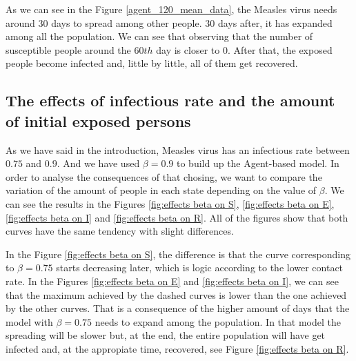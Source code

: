 \documentclass[a4paper]{article}
\begin{document}
As we can see in the Figure \ref{agent_120_mean_data}, the Measles virus needs around $30$ days to spread among other people. $30$ days after, it has expanded among all the population. We can see that observing that the number of susceptible people around the $60th$ day is closer to $0$. After that, the exposed people become infected and, little by little, all of them get recovered.

\subsection{The effects of infectious rate and the amount of initial exposed persons} %
As we have said in the introduction, Measles virus has an infectious rate between $0.75$ and $0.9$. And we have used $\beta = 0.9$ to build up the Agent-based model. In order to analyse the consequences of that chosing, we want to compare the variation of the amount of people in each state depending on the value of $\beta$. We can see the results in the Figures \ref{fig:effects beta on S}, \ref{fig:effects beta on E}, \ref{fig:effects beta on I} and \ref{fig:effects beta on R}. All of the figures show that both curves have the same tendency with slight differences.

In the Figure \ref{fig:effects beta on S}, the difference is that the curve corresponding to $\beta=0.75$ starts decreasing later, which is logic according to the lower contact rate. In the Figures \ref{fig:effects beta on E} and \ref{fig:effects beta on I}, we can see that the maximum achieved by the dashed curves is lower than the one achieved by the other curves. That is a consequence of the higher amount of days that the model with $\beta=0.75$ needs to expand among the population. In that model the spreading will be slower but, at the end, the entire population will have get infected and, at the appropiate time, recovered, see Figure \ref{fig:effects beta on R}.
\end{document}
